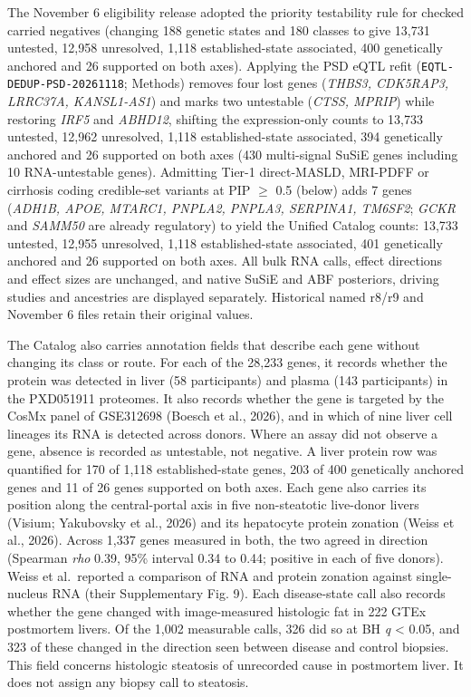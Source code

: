 The November 6 eligibility release adopted the priority testability rule for checked carried negatives (changing 188 genetic states and 180 classes to give 13,731 untested, 12,958 unresolved, 1,118 established-state associated, 400 genetically anchored and 26 supported on both axes). Applying the PSD eQTL refit (\texttt{EQTL-DEDUP-PSD-20261118}; Methods) removes four lost genes (\emph{THBS3, CDK5RAP3, LRRC37A, KANSL1-AS1}) and marks two untestable (\emph{CTSS, MPRIP}) while restoring \emph{IRF5} and \emph{ABHD12}, shifting the expression-only counts to 13,733 untested, 12,962 unresolved, 1,118 established-state associated, 394 genetically anchored and 26 supported on both axes (430 multi-signal SuSiE genes including 10 RNA-untestable genes). Admitting Tier-1 direct-MASLD, MRI-PDFF or cirrhosis coding credible-set variants at PIP $\ge$ 0.5 (below) adds 7 genes (\emph{ADH1B, APOE, MTARC1, PNPLA2, PNPLA3, SERPINA1, TM6SF2}; \emph{GCKR} and \emph{SAMM50} are already regulatory) to yield the Unified Catalog counts: 13,733 untested, 12,955 unresolved, 1,118 established-state associated, 401 genetically anchored and 26 supported on both axes. All bulk RNA calls, effect directions and effect sizes are unchanged, and native SuSiE and ABF posteriors, driving studies and ancestries are displayed separately. Historical named r8/r9 and November 6 files retain their original values.

The Catalog also carries annotation fields that describe each gene without
changing its class or route. For each of the 28,233 genes, it records whether
the protein was detected in liver (58 participants) and plasma (143
participants) in the PXD051911 proteomes. It also records whether the gene is
targeted by the CosMx panel of GSE312698 (Boesch et al., 2026), and in which of
nine liver cell lineages its RNA is detected across donors. Where an assay did
not observe a gene, absence is recorded as untestable, not negative. A liver
protein row was quantified for 170 of 1,118 established-state genes, 203 of 400
genetically anchored genes and 11 of 26 genes supported on both axes. Each gene
also carries its position along the central-portal axis in five non-steatotic
live-donor livers (Visium; Yakubovsky et al., 2026) and its hepatocyte protein
zonation (Weiss et al., 2026). Across 1,337 genes measured in both, the two
agreed in direction (Spearman \emph{rho} 0.39, 95\% interval 0.34 to 0.44; positive in
each of five donors). Weiss et al.~reported a comparison of RNA and protein
zonation against single-nucleus RNA (their Supplementary Fig. 9). Each
disease-state call also records whether the gene changed with image-measured
histologic fat in 222 GTEx postmortem livers. Of the 1,002 measurable calls, 326
did so at BH \emph{q} \textless{} 0.05, and 323 of these changed in the direction seen between
disease and control biopsies. This field concerns histologic steatosis of
unrecorded cause in postmortem liver. It does not assign any biopsy call to
steatosis.

